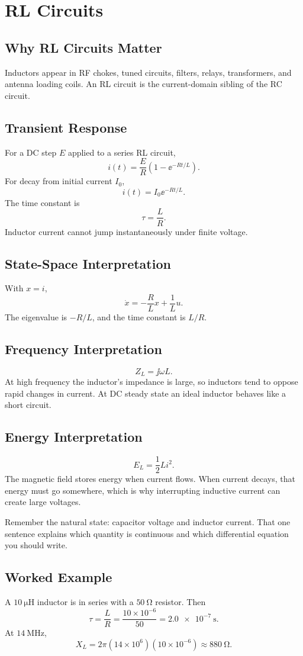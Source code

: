 \chapter{RL Circuits}
\section{Why RL Circuits Matter}
Inductors appear in RF chokes, tuned circuits, filters, relays, transformers,
and antenna loading coils. An RL circuit is the current-domain sibling of the RC
circuit.

\section{Transient Response}
For a DC step \(E\) applied to a series RL circuit,
\[
i(t)=\frac{E}{R}\left(1-\ee^{-Rt/L}\right).
\]
For decay from initial current \(I_0\),
\[
i(t)=I_0\ee^{-Rt/L}.
\]
The time constant is
\[
\tau=\frac{L}{R}.
\]
Inductor current cannot jump instantaneously under finite voltage.

\section{State-Space Interpretation}
With \(x=i\),
\[
\dot{x}=-\frac{R}{L}x+\frac{1}{L}u.
\]
The eigenvalue is \(-R/L\), and the time constant is \(L/R\).

\section{Frequency Interpretation}
\[
Z_L=\jj\omega L.
\]
At high frequency the inductor's impedance is large, so inductors tend to oppose
rapid changes in current. At DC steady state an ideal inductor behaves like a
short circuit.

\section{Energy Interpretation}
\[
E_L=\frac{1}{2}Li^2.
\]
The magnetic field stores energy when current flows. When current decays, that
energy must go somewhere, which is why interrupting inductive current can create
large voltages.

\begin{exambox}
Remember the natural state: capacitor voltage and inductor current. That one
sentence explains which quantity is continuous and which differential equation
you should write.
\end{exambox}

\section{Worked Example}
A \(\SI{10}{\micro\henry}\) inductor is in series with a \(\SI{50}{\ohm}\)
resistor. Then
\[
\tau=\frac{L}{R}=\frac{10\times10^{-6}}{50}
=\SI{2.0e-7}{\second}.
\]
At \(\SI{14}{\mega\hertz}\),
\[
X_L=2\pi(14\times10^6)(10\times10^{-6})\approx \SI{880}{\ohm}.
\]
